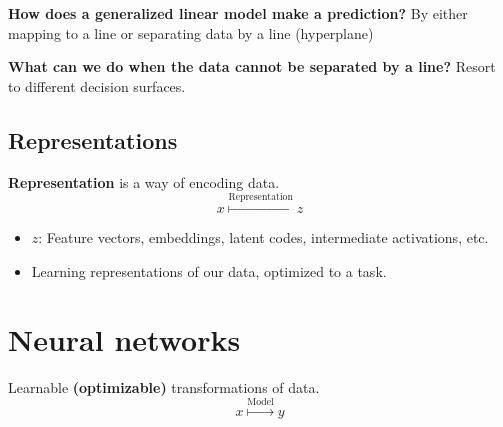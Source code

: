 \begin{notes} \textbf{How does a generalized linear model make a prediction?}
    By either mapping to a line or separating data by a line (hyperplane)
\end{notes}

\begin{notes} \textbf{What can we do when the data cannot be separated by a line?}
    Resort to different decision surfaces.
\end{notes}
\newpage

\subsection{Representations}
\begin{definition}
    \textbf{Representation} is a way of encoding data.
    \begin{equation}
        x \overset{\text{Representation}}{\mapsto} z
    \end{equation}
    \begin{itemize}
        \item $z$: Feature vectors, embeddings, latent codes, intermediate activations, etc.
    \end{itemize}
\end{definition}

\begin{notes}
    \begin{itemize}
        \item Learning representations of our data, optimized to a task.
    \end{itemize}
\end{notes}
\newpage

\section{Neural networks}
\begin{definition}
    Learnable \textbf{(optimizable)} transformations of data.
    \begin{equation}
        x \overset{\text{Model}}{\mapsto} y
    \end{equation}
\end{definition}

